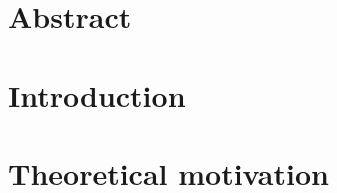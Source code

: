 \documentclass[11pt, a4paper]{book}
\begin{document}
\newpage\null\thispagestyle{empty}\newpage
\thispagestyle{empty}

\frontmatter %
\tableofcontents

\linenumbers
\chapter*{Abstract} 
\mainmatter %

\chapter{Introduction}%
%

\chapter{Theoretical motivation}%
%



%

%

%

%

%

%

%

%

%

\clearpage



\end{document}
